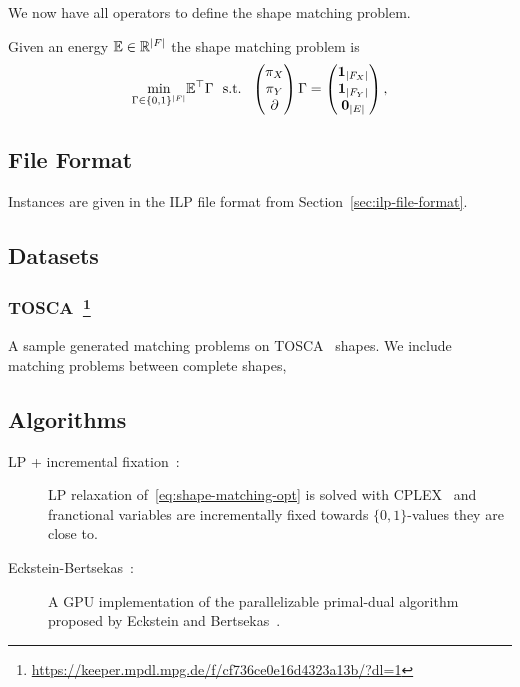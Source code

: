 We now have all operators to define the shape matching problem.
\begin{definition}
Given an energy $\mathbb{E} \in \mathbb{R}^{\lvert F\rvert}$ the shape matching problem is
\begin{equation} 
    \underset{\Gamma \in \{0, 1\}^{|F|}}{\text{min}} \mathbb{E}^\top  \Gamma  
    ~~  \text{s.t.} ~~
    \begin{pmatrix}
      \pi_X \\ \pi_Y \\ \partial
    \end{pmatrix}
    \Gamma
    = 
    \begin{pmatrix}
       \boldsymbol{1}_{|F_X|} \\ \boldsymbol{1}_{|F_Y|} \\ \boldsymbol{0}_{\lvert E\rvert} \\
    \end{pmatrix},
\label{eq:shape-matching-opt}
\end{equation}
\end{definition}

\subsection{File Format}
Instances are given in the ILP file format from Section~\ref{sec:ilp-file-format}.

\subsection{Datasets}
\subsubsection[TOSCA]{TOSCA~\footnote{\url{https://keeper.mpdl.mpg.de/f/cf736ce0e16d4323a13b/?dl=1}}}
A sample generated matching problems on TOSCA~\cite{} shapes. 
We include matching problems between complete shapes,


\subsection{Algorithms}
\begin{description}
\item[LP + incremental fixation~\cite{windheuser2011geometrically}:]
LP relaxation of~\eqref{eq:shape-matching-opt} is solved with CPLEX~\cite{cplex} and franctional variables are incrementally fixed towards $\{0,1\}$-values they are close to.
\item[Eckstein-Bertsekas~\cite{windheuser2011large}:]
A GPU implementation of the parallelizable primal-dual algorithm proposed by Eckstein and Bertsekas~\cite{eckstein1990alternating}.
\end{description}
